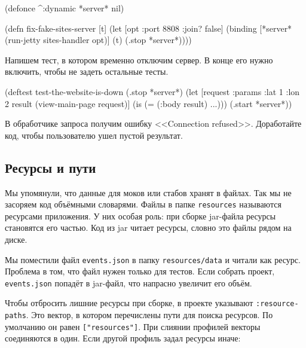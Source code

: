 
\begin{english}
  \begin{clojure}
(defonce ^:dynamic *server* nil)

(defn fix-fake-sites-server [t]
  (let [opt {:port 8808 :join? false}]
    (binding [*server*
              (run-jetty sites-handler opt)]
      (t)
      (.stop *server*))))
  \end{clojure}
\end{english}

Напишем тест, в котором временно отключим сервер. В конце его нужно включить,
чтобы не задеть остальные тесты.

\begin{english}
  \begin{clojure}
(deftest test-the-website-is-down
  (.stop *server*)
  (let [request {:params {:lat 1 :lon 2}}
        result (view-main-page request)]
    (is (= (:body result) {...})))
  (.start *server*))
  \end{clojure}
\end{english}

В обработчике запроса получим ошибку <<Connection refused>>. Доработайте код,
чтобы пользователю ушел пустой результат.

\subsection{Ресурсы и пути}

\label{resources}


Мы упомянули, что данные для моков или стабов хранят в файлах. Так мы не
засоряем код объёмными словарями. Файлы в папке \verb|resources| называются
ресурсами приложения. У них особая роль: при сборке jar-файла ресурсы становятся
его частью. Код из jar читает ресурсы, словно это файлы рядом на диске.

Мы поместили файл \verb|events.json| в папку \verb|resources/data| и читали
как ресурс. Проблема в том, что файл нужен только для тестов. Если собрать
проект, \verb|events.json| попадёт в jar-файл, что напрасно увеличит его
объём.

Чтобы отбросить лишние ресурсы при сборке, в проекте указывают
\verb|:resource-paths|. Это вектор, в котором перечислены пути для поиска
ресурсов. По умолчанию он равен \verb|["resources"]|. При слиянии профилей
векторы соединяются в один. Если другой профиль задал ресурсы иначе:

